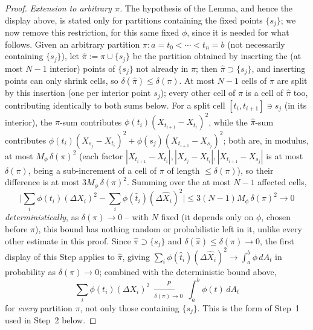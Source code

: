\documentclass[11pt,fleqn]{article}
\theoremstyle{plain}
\theoremstyle{remark}
\begin{document}
\begin{proof}
\smallskip\noindent\emph{Extension to arbitrary $\pi$.} The hypothesis
of the Lemma, and hence the display above, is stated only for partitions
containing the fixed points $\{s_j\}$; we now remove this restriction,
for this same fixed $\phi$, since it is needed for what follows. Given
an arbitrary partition $\pi\colon a=t_0<\cdots<t_n=b$ (not necessarily
containing $\{s_j\}$), let $\widehat\pi:=\pi\cup\{s_j\}$ be the partition
obtained by inserting the (at most $N-1$ interior) points of $\{s_j\}$
not already in $\pi$; then $\widehat\pi\supset\{s_j\}$, and inserting
points can only shrink cells, so $\delta(\widehat\pi)\le\delta(\pi)$.
At most $N-1$ cells of $\pi$ are split by this insertion (one per
interior point $s_j$); every other cell of $\pi$ is a cell of
$\widehat\pi$ too, contributing identically to both sums below.
For a split cell $[t_i,t_{i+1}]\ni s_j$ (in its interior), the
$\pi$-sum contributes $\phi(t_i)(X_{t_{i+1}}-X_{t_i})^2$, while the
$\widehat\pi$-sum contributes
$\phi(t_i)(X_{s_j}-X_{t_i})^2+\phi(s_j)(X_{t_{i+1}}-X_{s_j})^2$; both
are, in modulus, at most $M_\phi\,\delta(\pi)^2$ (each factor
$|X_{t_{i+1}}-X_{t_i}|,|X_{s_j}-X_{t_i}|,|X_{t_{i+1}}-X_{s_j}|$ is at
most $\delta(\pi)$, being a sub-increment of a cell of $\pi$ of length
$\le\delta(\pi)$), so their difference is at most $3M_\phi\,\delta(\pi)^2$.
Summing over the at most $N-1$ affected cells,
\[
\Big|\sum_i\phi(t_i)(\Delta X_i)^2-\sum_i\phi(\hat t_i)(\Delta\widehat
X_i)^2\Big|\le3(N-1)M_\phi\,\delta(\pi)^2\longrightarrow0
\]
\emph{deterministically}, as $\delta(\pi)\to0$ -- with $N$ fixed (it
depends only on $\phi$, chosen before $\pi$), this bound has nothing
random or probabilistic left in it, unlike every other estimate in this
proof. Since $\widehat\pi\supset\{s_j\}$ and
$\delta(\widehat\pi)\le\delta(\pi)\to0$, the first display of this Step
applies to $\widehat\pi$, giving
$\sum_i\phi(\hat t_i)(\Delta\widehat X_i)^2\to\int_a^b\phi\,dA_t$ in
probability as $\delta(\pi)\to0$; combined with the deterministic bound
above,
\[
\sum_i\phi(t_i)(\Delta X_i)^2\ \xrightarrow[\delta(\pi)\to0]{P}\
\int_a^b\phi(t)\,dA_t
\]
for \emph{every} partition $\pi$, not only those containing $\{s_j\}$.
This is the form of Step~1 used in Step~2 below.


\end{proof}
\end{document}
